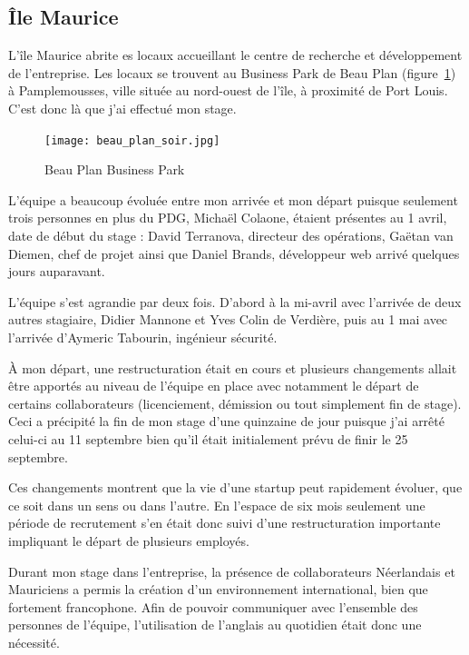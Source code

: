 \documentclass[a4paper,10pt, twoside]{report}
\begin{document}
\begin{spacing}{1.2}
\section{\^Ile Maurice}
L'\^ile Maurice abrite es locaux accueillant le centre de recherche et
d\'eveloppement de l'entreprise. Les locaux se trouvent au Business Park de
Beau Plan (figure~\ref{beauPlan}) \`a Pamplemousses, ville situ\'ee au
nord-ouest de l'\^ile, \`a proximit\'e de Port Louis. C'est donc l\`a que
j'ai effectu\'e mon stage.

\begin{figure}[h!]
  \centering
  \texttt{[image: beau\_plan\_soir.jpg]}
  \caption{\label{beauPlan} Beau Plan Business Park}
\end{figure}

L'\'equipe a beaucoup \'evolu\'ee entre mon arriv\'ee et mon d\'epart puisque
seulement trois personnes en plus du PDG, Micha\"el Colaone, \'etaient
pr\'esentes au 1 avril, date de d\'ebut du stage : David Terranova,
directeur des op\'erations, Ga\"etan van Diemen, chef de projet ainsi que
Daniel Brands, d\'eveloppeur web arriv\'e quelques jours auparavant.

L'\'equipe s'est agrandie par deux fois. D'abord \`a la mi-avril avec
l'arriv\'ee de deux autres stagiaire, Didier Mannone et
Yves Colin de Verdi\`ere, puis au 1 mai avec l'arriv\'ee d'Aymeric
Tabourin, ing\'enieur s\'ecurit\'e.

\`A mon d\'epart, une restructuration \'etait en cours et plusieurs changements
allait \^etre apport\'es au niveau de l'\'equipe en place avec notamment le
d\'epart de certains collaborateurs (licenciement, d\'emission ou tout
simplement fin de stage). Ceci a pr\'ecipit\'e la fin de mon stage d'une
quinzaine de jour puisque j'ai arr\^et\'e celui-ci au 11 septembre bien qu'il
\'etait initialement pr\'evu de finir le 25 septembre.

Ces changements montrent que la vie d'une startup peut rapidement \'evoluer,
que ce soit dans un sens ou dans l'autre. En l'espace de six mois seulement
une p\'eriode de recrutement s'en \'etait donc suivi d'une restructuration
importante impliquant le d\'epart de plusieurs employ\'es.

Durant mon stage dans l'entreprise, la pr\'esence de collaborateurs
N\'eerlandais et Mauriciens a permis la cr\'eation d'un environnement
international, bien que fortement francophone. Afin de pouvoir communiquer avec
l'ensemble des personnes de l'\'equipe, l'utilisation de l'anglais au quotidien
\'etait donc une n\'ecessit\'e.


\end{spacing}
\end{document}
